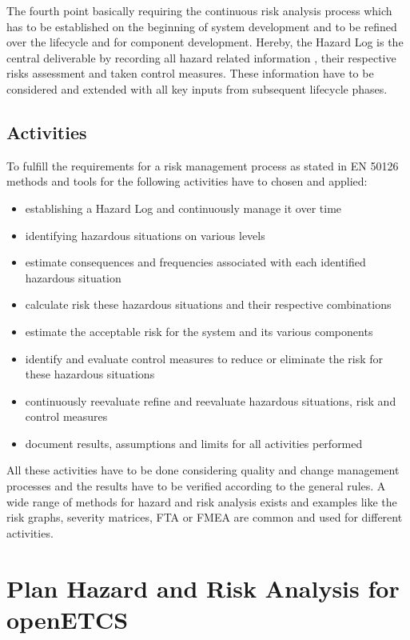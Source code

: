 \documentclass{template/openetcs_report}
\begin{document}
The fourth point basically requiring the continuous risk analysis process which has to be established on the beginning of system development and to be refined over the lifecycle and for component development. Hereby, the Hazard Log is the central deliverable by recording all hazard related information , their respective risks assessment and taken control measures. These information have to be considered and extended with all key inputs from subsequent lifecycle phases.

\subsection{Activities}

To fulfill the requirements for a risk management process as stated in EN 50126 methods and tools for the following activities have to chosen and applied:

\begin{itemize}
\item establishing a Hazard Log and continuously manage it over time
\item identifying hazardous situations on various levels
\item estimate consequences and frequencies associated with each identified hazardous situation
\item calculate risk these hazardous situations and their respective combinations
\item estimate the acceptable risk for the system and its various components
\item identify and evaluate control measures to reduce or eliminate the risk for these hazardous situations
\item continuously reevaluate refine and reevaluate hazardous situations, risk and control measures
\item document results, assumptions and limits for all activities performed
\end{itemize}

All these activities have to be done considering quality and change management processes and the results have to be verified according to the general rules. A wide range of methods for hazard and risk analysis exists and examples like the risk graphs, severity matrices, FTA or FMEA are common and used for different activities.


\section{Plan Hazard and Risk Analysis for openETCS}
\end{document}
